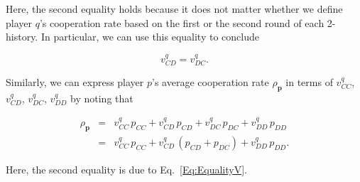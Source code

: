 \documentclass{article}
\theoremstyle{definition}
\begin{document}
Here, the second equality holds because it does not matter whether we define
player $q$'s cooperation rate based on the first or the second round of each
2-history. In particular, we can use this equality to conclude

\begin{equation} \label{Eq:EqualityV}
v^q_{CD} = v^q_{DC}.
\end{equation}

Similarly, we can express player $p$'s average cooperation rate
$\rho_\mathbf{p}$ in terms of $v^q_{CC}$, $v^q_{CD}$, $v^q_{DC}$, $v^q_{DD}$ by
noting that

\begin{equation} \label{Eq:rhop_n2}
\begin{array}{lll}
\rho_\mathbf{p} &= &\displaystyle v^q_{CC}\, p_{CC} +  v^q_{CD}\,p_{CD} + v^q_{DC}\, p_{DC} + v^q_{DD}\, p_{DD}\\[0.2cm]
	& =  &v^q_{CC}\, p_{CC} +  v^q_{CD}\,(p_{CD}\!+\!p_{DC}) + v^q_{DD}\, p_{DD}.
\end{array}
\end{equation}

Here, the second equality is due to Eq.~\eqref{Eq:EqualityV}.

 
\end{document}
